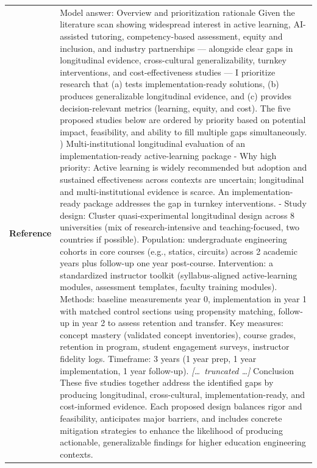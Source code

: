 \begin{longtable}{@{}l p{12.5cm}@{}}
  \textbf{Reference} & Model answer: \newline Overview and prioritization rationale \newline Given the literature scan showing widespread interest in active learning, AI-assisted tutoring, competency-based assessment, equity and inclusion, and industry partnerships --- alongside clear gaps in longitudinal evidence, cross-cultural generalizability, turnkey interventions, and cost-effectiveness studies --- I prioritize research that (a) tests implementation-ready solutions, (b) produces generalizable longitudinal evidence, and (c) provides decision-relevant metrics (learning, equity, and cost). The five proposed studies below are ordered by priority based on potential impact, feasibility, and ability to fill multiple gaps simultaneously. \newline 1) Multi-institutional longitudinal evaluation of an implementation-ready active-learning package \newline - Why high priority: Active learning is widely recommended but adoption and sustained effectiveness across contexts are uncertain; longitudinal and multi-institutional evidence is scarce. An implementation-ready package addresses the gap in turnkey interventions. \newline - Study design: Cluster quasi-experimental longitudinal design across 8 universities (mix of research-intensive and teaching-focused, two countries if possible). Population: undergraduate engineering cohorts in core courses (e.g., statics, circuits) across 2 academic years plus follow-up one year post-course. Intervention: a standardized instructor toolkit (syllabus-aligned active-learning modules, assessment templates, faculty training modules). Methods: baseline measurements year 0, implementation in year 1 with matched control sections using propensity matching, follow-up in year 2 to assess retention and transfer. Key measures: concept mastery (validated concept inventories), course grades, retention in program, student engagement surveys, instructor fidelity logs. Timeframe: 3 years (1 year prep, 1 year implementation, 1 year follow-up). \newline \textit{[\ldots\ truncated \ldots]} \newline Conclusion \newline These five studies together address the identified gaps by producing longitudinal, cross-cultural, implementation-ready, and cost-informed evidence. Each proposed design balances rigor and feasibility, anticipates major barriers, and includes concrete mitigation strategies to enhance the likelihood of producing actionable, generalizable findings for higher education engineering contexts. \\

\end{longtable}
